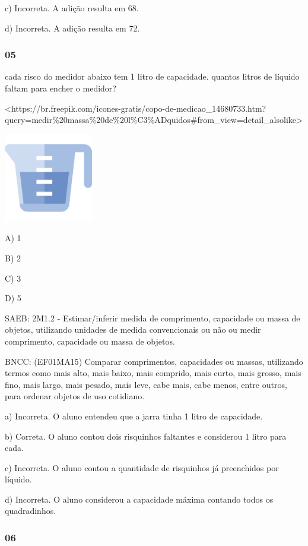 c) Incorreta. A adição resulta em 68.

d) Incorreta. A adição resulta em 72.

\subsubsection{05}\label{section-106}

cada risco do medidor abaixo tem 1 litro de capacidade. quantos litros
de líquido faltam para encher o medidor?

\textless{}https://br.freepik.com/icones-gratis/copo-de-medicao\_14680733.htm?query=medir\%20massa\%20de\%20l\%C3\%ADquidos\#from\_view=detail\_alsolike\textgreater{}

\includegraphics[width=1.53125in,height=1.53125in]{media/image113.png}

A) 1

B) 2

C) 3

D) 5

SAEB: 2M1.2 - Estimar/inferir medida de comprimento, capacidade ou massa
de objetos, utilizando unidades de medida convencionais ou não ou medir
comprimento, capacidade ou massa de objetos.

BNCC: (EF01MA15) Comparar comprimentos, capacidades ou massas,
utilizando termos como mais alto, mais baixo, mais comprido, mais curto,
mais grosso, mais fino, mais largo, mais pesado, mais leve, cabe mais,
cabe menos, entre outros, para ordenar objetos de uso cotidiano.

a) Incorreta. O aluno entendeu que a jarra tinha 1 litro de capacidade.

b) Correta. O aluno contou dois risquinhos faltantes e considerou 1
litro para cada.

c) Incorreta. O aluno contou a quantidade de risquinhos já preenchidos
por líquido.

d) Incorreta. O aluno considerou a capacidade máxima contando todos os
quadradinhos.

\subsubsection{06}\label{section-107}

